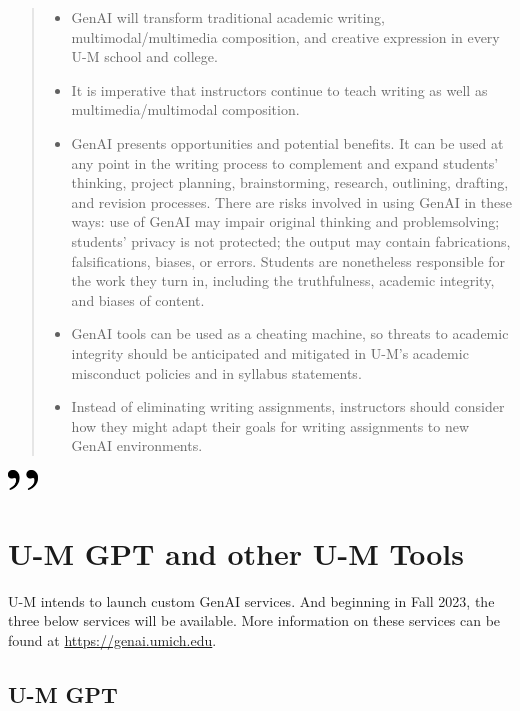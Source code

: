 \documentclass[
]{book}
\begin{document}
\begin{quote}
\begin{itemize}
\item
  GenAI will transform traditional academic writing, multimodal/multimedia composition, and creative expression in every U-M school and college.
\item
  It is imperative that instructors continue to teach writing as well as multimedia/multimodal composition.
\item
  GenAI presents opportunities and potential benefits. It can be used at any point in the writing process to complement and expand students' thinking, project planning, brainstorming, research, outlining, drafting, and revision processes. There are risks involved in using GenAI in these ways: use of GenAI may impair original thinking and problemsolving; students' privacy is not protected; the output may contain fabrications, falsifications, biases, or errors. Students are nonetheless responsible for the work they turn in, including the truthfulness, academic integrity, and biases of content.
\item
  GenAI tools can be used as a cheating machine, so threats to academic integrity should be anticipated and mitigated in U-M's academic misconduct policies and in syllabus statements.
\item
  Instead of eliminating writing assignments, instructors should consider how they might adapt their goals for writing assignments to new GenAI environments.
\end{itemize}
\end{quote}

\includegraphics[width=0.3125in,height=0.20833in]{close.png}

\hypertarget{u-m-gpt-and-other-u-m-tools}{%
\section{U-M GPT and other U-M Tools}\label{u-m-gpt-and-other-u-m-tools}}

U-M intends to launch custom GenAI services. And beginning in Fall 2023, the three below services will be available. More information on these services can be found at \url{https://genai.umich.edu}.

\hypertarget{u-m-gpt}{%
\subsection{U-M GPT}\label{u-m-gpt}}
\end{document}
